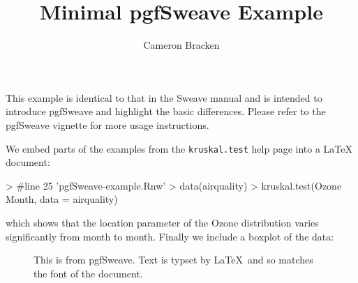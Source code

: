 \documentclass{article}
\title{Minimal pgfSweave Example}
\author{Cameron Bracken}
\begin{document}
\maketitle
This example is identical to that in the Sweave manual and is intended to 
introduce pgfSweave and highlight the basic differences.  Please refer to 
the pgfSweave vignette for more usage instructions. 

We embed parts of the examples from the \texttt{kruskal.test} help page 
into a \LaTeX{} document:

\begin{Schunk}
\begin{Sinput}
> #line 25 'pgfSweave-example.Rnw'
> data(airquality)
> kruskal.test(Ozone ~ Month, data = airquality)
\end{Sinput}
\end{Schunk}
\noindent which shows that the location parameter of the Ozone distribution varies 
significantly from month to month. Finally we include a boxplot of the data:


\begin{figure}[!ht]
\centering

\endpgfgraphicnamed
\caption{This is from pgfSweave. Text is typset by \LaTeX\ and so matches the
 font of the document.}
\end{figure}
\end{document}
